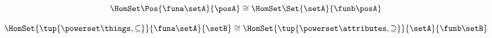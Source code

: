 {\begin{forslides}
        \begin{equation}
            \label{eq:slides_adjunctions_94}
            \HomSet\Pos{\funa \setA}{\posA}  \cong \HomSet\Set{\setA}{\funb \posA }
        \end{equation}

        \begin{equation}
            \label{eq:slides_adjunctions_95}
            \HomSet{\tup{\powerset \things, \subseteq}}{\funa \setA}{\setB}  \cong \HomSet{\tup{\powerset \attributes, \supseteq}}{\setA}{\funb \setB }
        \end{equation}

    \end{forslides}

}
